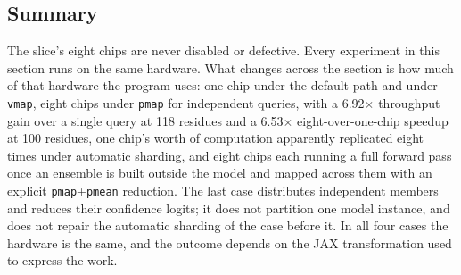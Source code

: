 \subsection{Summary}
\label{sec:par-summary}

The slice's eight chips are never disabled or defective. Every
experiment in this section runs on the same hardware. What changes
across the section is how much of that hardware the program
uses: one chip under the default path and under \texttt{vmap},
eight chips under \texttt{pmap} for independent queries, with a
6.92$\times$ throughput gain over a single query at 118 residues and a
6.53$\times$ eight-over-one-chip speedup at 100 residues, one chip's
worth of computation
apparently replicated eight times under automatic sharding, and
eight chips each running a full forward pass once an ensemble is built
outside the model and mapped across them with an explicit
\texttt{pmap}+\texttt{pmean} reduction. The last case distributes
independent members and reduces their confidence logits; it does not
partition one model instance, and does not repair the automatic
sharding of the case before it. In all four cases the hardware is the
same, and the outcome depends on the JAX transformation used to
express the work.
